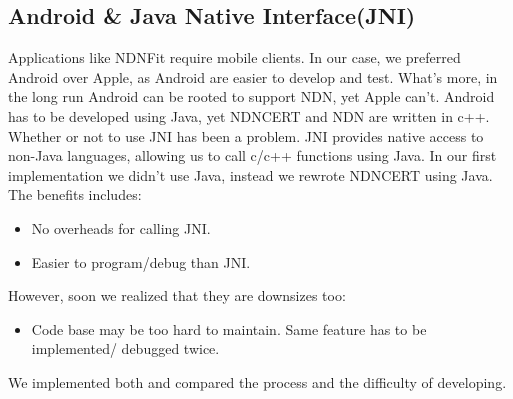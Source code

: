 \documentclass[a0,portrait]{poster}
\begin{document}
\begin{multicols}{2}
\subsection*{Android \& Java Native Interface(JNI)}
\par 
	Applications like NDNFit require mobile clients. 
	In our case, we preferred Android over Apple, as Android are easier to develop and test.
	What's more, in the long run Android can be rooted to support NDN, yet Apple can't.
	Android has to be developed using Java, yet NDNCERT and NDN are written in c++. 
	Whether or not to use JNI has been a problem. 
	JNI provides native access to non-Java languages, allowing us to call c/c++ functions using Java. 
	In our first implementation we didn't use Java, instead we rewrote NDNCERT using Java. The benefits includes:
	\begin{itemize}
		\item No overheads for calling JNI.
		\item Easier to program/debug than JNI.
	\end{itemize}
\par
	However, soon we realized that they are downsizes too:
	\begin{itemize}
		\item Code base may be too hard to maintain. Same feature has to be implemented/ debugged twice.
	\end{itemize}
\par
	We implemented both and compared the process and the difficulty of developing.



\end{multicols}
\end{document}
